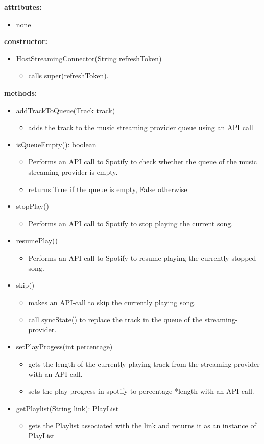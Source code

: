 \documentclass[oneside, ngerman]{sdqtechreport}
\begin{document}
\textbf{attributes:}
\begin{itemize}
    \item none
\end{itemize}
\textbf{constructor:}
\begin{itemize}
    \item HostStreamingConnector(String refreshToken)
    \begin{itemize}
        \item calls super(refreshToken).
    \end{itemize}
\end{itemize}
\textbf{methods:}
\begin{itemize}
    \item addTrackToQueue(Track track)
    \begin{itemize}
        \item adds the track to the music streaming provider queue using an API call
    \end{itemize}
    \item isQueueEmpty(): boolean
    \begin{itemize}
        \item Performs an API call to Spotify to check whether the queue of the music streaming provider is empty.
        \item returns True if the queue is empty, False otherwise
    \end{itemize}
    \item stopPlay()
    \begin{itemize}
        \item Performs an API call to Spotify to stop playing the current song.
    \end{itemize}
    \item resumePlay()
    \begin{itemize}
        \item Performs an API call to Spotify to resume playing the currently stopped song.
    \end{itemize}
    \item skip()
    \begin{itemize}
        \item makes an API-call to skip the currently playing song.
        \item call syncState() to replace the track in the queue of the streaming-provider.
    \end{itemize}
    \item setPlayProgess(int percentage)
    \begin{itemize}
        \item gets the length of the currently playing track from the streaming-provider with an API call.
        \item sets the play progress in spotify to  percentage *length with an API call.
    \end{itemize}
    \item getPlaylist(String link): PlayList
    \begin{itemize}
        \item gets the Playlist associated with the link and returns it as an instance of PlayList
    \end{itemize}
\end{itemize}
\end{document}
